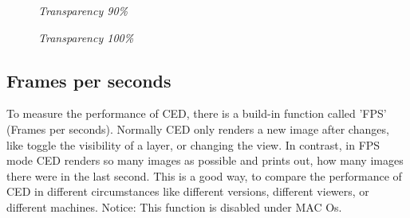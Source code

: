 \documentclass[a4paper,10pt]{article}
\begin{document}
\begin{figure}[h!]
\begin{minipage}[t]{6cm}
\setlength{\fboxsep}{0mm}
\centerline{}
\caption{\label{CEDViewer} \textsl{Transparency 90\%}}
\end{minipage}
\hfill
\begin{minipage}[t]{6cm}
\setlength{\fboxsep}{0mm}
\centerline{}
\caption{\label{DSTViewer}\textsl{Transparency 100\%}}
\end{minipage}
\end{figure}

\subsection{Frames per seconds}
To measure the performance of CED, there is a build-in function called 'FPS' (Frames per seconds). Normally CED only renders a new image after changes, like toggle the visibility of a layer, or changing the view. In contrast, in FPS mode CED renders so many images as possible and prints out, how many images there were in the last second. This is a good way, to compare the performance of CED in different circumstances like different versions, different viewers, or different machines. 
\newline\newline
Notice: This function is disabled under MAC Os. 
\end{document}
